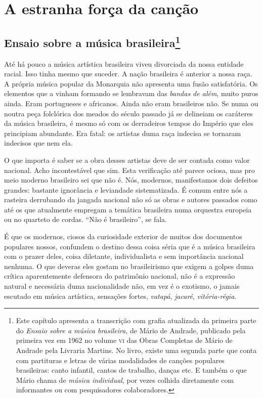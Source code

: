 \part{A estranha força da canção}

\chapter{Ensaio sobre a música brasileira\footnote{Este capítulo apresenta a transcrição com grafia atualizada da primeira parte do \textit{Ensaio sobre a música brasileira}, de Mário de Andrade, publicado pela primeira vez em 1962 no volume \textsc{vi} das Obras Completas de Mário de Andrade pela Livraria Martins. No livro, existe uma segunda parte que conta com partituras e letras de várias modalidades de canções populares brasileiras: canto infantil, cantos de trabalho, danças etc. E também o que Mário chama de \textit{música individual}, por vezes colhida diretamente com informantes ou com pesquisadores colaboradores.}}

Até há pouco a música artística brasileira viveu divorciada da nossa
entidade racial. Isso tinha mesmo que suceder. A nação brasileira é
anterior a nossa raça. A própria música popular da Monarquia não
apresenta uma fusão satisfatória. Os elementos que a vinham formando se
lembravam das \textit{bandas de além}, muito puros ainda. Eram portugueses
e africanos. Ainda não eram brasileiros não. Se numa ou noutra peça
folclórica dos meados do século passado já se delineiam os caráteres da
música brasileira, é mesmo só com os derradeiros tempos do Império que
eles principiam abundante. Era fatal: os artistas duma raça indecisa se
tornaram indecisos que nem ela.

O que importa é saber se a obra desses artistas deve de ser contada como
valor nacional. Acho incontestável que sim. Esta verificação até parece
ociosa, mas pro meio moderno brasileiro sei que não
é. Nós, modernos, manifestamos dois defeitos grandes:
bastante ignorância e leviandade sistematizada. É comum entre nós a
rasteira derrubando da jangada nacional não só as obras e autores
passados como até os que atualmente empregam a temática brasileira numa
orquestra europeia ou no quarteto de cordas. ``Não é brasileiro'', se fala.

É que os modernos, ciosos da curiosidade exterior de muitos dos
documentos populares nossos, confundem o destino dessa coisa séria que é
a música brasileira com o prazer deles, coisa diletante, individualista
e sem importância nacional nenhuma. O que deveras eles gostam no
brasileirismo que exigem a golpes duma crítica aparentemente defensora
do patrimônio nacional, não é a expressão natural e necessária duma
nacionalidade não, em vez é o exotismo, o jamais escutado em música
artística, sensações fortes, \textit{vatapá}, \textit{jacaré}, \textit{vitória-régia}.

